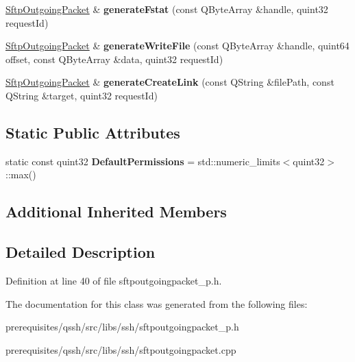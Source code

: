 \begin{DoxyCompactItemize}
\item 
\mbox{\label{class_q_ssh_1_1_internal_1_1_sftp_outgoing_packet_a7deeabac06543e0bde3b1f8e9e2f00f1}} 
\mbox{\hyperlink{class_q_ssh_1_1_internal_1_1_sftp_outgoing_packet}{Sftp\+Outgoing\+Packet}} \& {\bfseries generate\+Fstat} (const Q\+Byte\+Array \&handle, quint32 request\+Id)
\item 
\mbox{\label{class_q_ssh_1_1_internal_1_1_sftp_outgoing_packet_a72c9edf17eabb17ff0f22706821944e1}} 
\mbox{\hyperlink{class_q_ssh_1_1_internal_1_1_sftp_outgoing_packet}{Sftp\+Outgoing\+Packet}} \& {\bfseries generate\+Write\+File} (const Q\+Byte\+Array \&handle, quint64 offset, const Q\+Byte\+Array \&data, quint32 request\+Id)
\item 
\mbox{\label{class_q_ssh_1_1_internal_1_1_sftp_outgoing_packet_a5529457e7c25b7f471bcb4fc26225075}} 
\mbox{\hyperlink{class_q_ssh_1_1_internal_1_1_sftp_outgoing_packet}{Sftp\+Outgoing\+Packet}} \& {\bfseries generate\+Create\+Link} (const Q\+String \&file\+Path, const Q\+String \&target, quint32 request\+Id)
\end{DoxyCompactItemize}
\subsection*{Static Public Attributes}
\begin{DoxyCompactItemize}
\item 
\mbox{\label{class_q_ssh_1_1_internal_1_1_sftp_outgoing_packet_ad659069439456d33a4cc24c245fc8abd}} 
static const quint32 {\bfseries Default\+Permissions} = std\+::numeric\+\_\+limits$<$quint32$>$\+::max()
\end{DoxyCompactItemize}
\subsection*{Additional Inherited Members}


\subsection{Detailed Description}


Definition at line 40 of file sftpoutgoingpacket\+\_\+p.\+h.



The documentation for this class was generated from the following files\+:\begin{DoxyCompactItemize}
\item 
prerequisites/qssh/src/libs/ssh/sftpoutgoingpacket\+\_\+p.\+h\item 
prerequisites/qssh/src/libs/ssh/sftpoutgoingpacket.\+cpp\end{DoxyCompactItemize}
